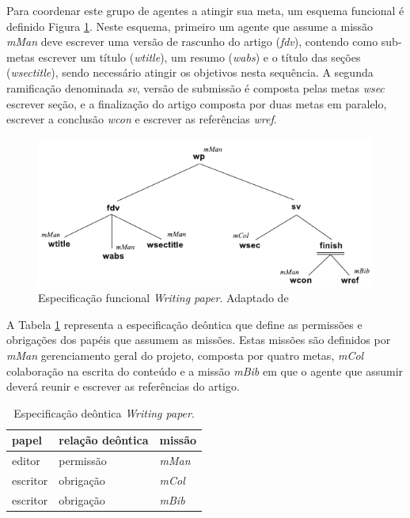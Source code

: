 Para coordenar este grupo de agentes a atingir sua meta, um esquema funcional é definido Figura \ref{fig:writing-paper-funcional}. Neste esquema, primeiro um agente que assume a missão \textit{mMan} deve escrever uma versão de rascunho do artigo (\textit{fdv}), contendo como sub-metas escrever um título (\textit{wtitle}), um resumo (\textit{wabs}) e o título das seções (\textit{wsectitle}), sendo necessário atingir os objetivos nesta sequência. A segunda ramificação denominada \textit{sv}, versão de submissão é composta pelas metas \textit{wsec} escrever seção, e a finalização do artigo composta por duas metas em paralelo, escrever a conclusão \textit{wcon} e escrever as referências \textit{wref}.
    
\begin{figure}[ht]
\centering
\includegraphics[scale=1.3]{imagens/5-writing-paper-funcional.pdf}
\caption{Especificação funcional \textit{Writing paper}. Adaptado de \cite{hubner2011normative}}
\label{fig:writing-paper-funcional}
\end{figure}

A Tabela \ref{tab:writing-paper-deontica} representa a especificação deôntica que define as permissões e obrigações dos papéis que assumem as missões. Estas missões são definidos por \textit{mMan} gerenciamento geral do projeto, composta por quatro metas, \textit{mCol} colaboração na escrita do conteúdo  e a missão \textit{mBib} em que o agente que assumir deverá reunir e escrever as referências do artigo.

\begin{table}[ht]
\centering
\caption{Especificação deôntica \textit{Writing paper}. \cite{hubner2011normative}}
\label{tab:writing-paper-deontica}
\begin{tabular}{@{}lll@{}}
\toprule
papel       & relação deôntica  & missão                        \\ \midrule
editor      & permissão         & \textit{mMan}                          \\
escritor    & obrigação         & \textit{mCol}                          \\
escritor    & obrigação         & \textit{mBib}                          \\
\bottomrule
\end{tabular}
\end{table}

